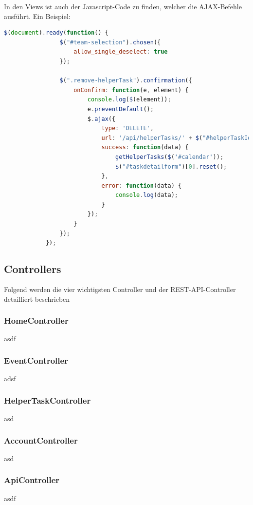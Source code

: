 			In den Views ist auch der Javascript-Code zu finden, welcher die AJAX-Befehle ausführt. Ein Beispiel:

			\begin{lstlisting}[language=javascript, caption=text/javascript, label=lst:AJAX Example firstnumber=1]
			$(document).ready(function() {
	            $("#team-selection").chosen({
	                allow_single_deselect: true
	            });

	            $(".remove-helperTask").confirmation({
	                onConfirm: function(e, element) {
	                    console.log($(element));
	                    e.preventDefault();
	                    $.ajax({
	                        type: 'DELETE',
	                        url: '/api/helperTasks/' + $("#helperTaskId").val(),
	                        success: function(data) {
	                            getHelperTasks($('#calendar'));
	                            $("#taskdetailform")[0].reset();
	                        },
	                        error: function(data) {
	                            console.log(data);
	                        }
	                    });
	                }
	            });
	        });
			\end{lstlisting}

	\subsection{Controllers}
		Folgend werden die vier wichtigsten Controller und der REST-API-Controller detailliert beschrieben
		\subsubsection{HomeController}
		asdf
		\subsubsection{EventController}
		adsf
		\subsubsection{HelperTaskController}
		asd
		\subsubsection{AccountController}
		asd
		\subsubsection{ApiController}
		asdf




